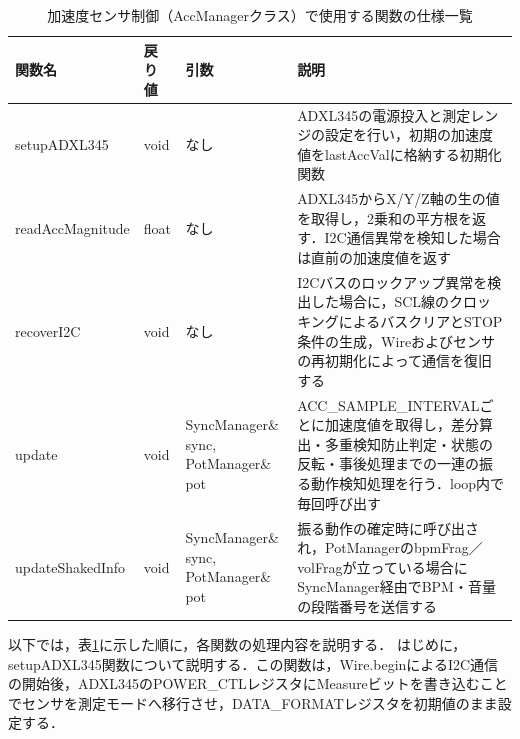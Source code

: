 \begin{table}[H]
    \caption{加速度センサ制御（AccManagerクラス）で使用する関数の仕様一覧}
    \centering
    \label{table:siki_acc_func}
    \begin{tabular}{p{3.8cm}p{1.6cm}p{3.2cm}p{4.9cm}}
    \hline
    \textbf{関数名} & \textbf{戻り値} & \textbf{引数} & \textbf{説明}\\
    \hline
    setupADXL345 & void & なし & ADXL345の電源投入と測定レンジの設定を行い，初期の加速度値をlastAccValに格納する初期化関数\\
    \hline
    readAccMagnitude & float & なし & ADXL345からX/Y/Z軸の生の値を取得し，2乗和の平方根を返す．I2C通信異常を検知した場合は直前の加速度値を返す\\
    \hline
    recoverI2C & void & なし & I2Cバスのロックアップ異常を検出した場合に，SCL線のクロッキングによるバスクリアとSTOP条件の生成，Wireおよびセンサの再初期化によって通信を復旧する\\
    \hline
    update & void & SyncManager\& sync, PotManager\& pot & ACC\_SAMPLE\_INTERVALごとに加速度値を取得し，差分算出・多重検知防止判定・状態の反転・事後処理までの一連の振る動作検知処理を行う．loop内で毎回呼び出す\\
    \hline
    updateShakedInfo & void & SyncManager\& sync, PotManager\& pot & 振る動作の確定時に呼び出され，PotManagerのbpmFrag／volFragが立っている場合にSyncManager経由でBPM・音量の段階番号を送信する\\
    \hline
    \end{tabular}
\end{table}

\fi


\iffalse
以下では，表\ref{table:siki_acc_func}に示した順に，各関数の処理内容を説明する．
はじめに，setupADXL345関数について説明する．この関数は，Wire.beginによるI2C通信の開始後，ADXL345のPOWER\_CTLレジスタにMeasureビットを書き込むことでセンサを測定モードへ移行させ，DATA\_FORMATレジスタを初期値のまま設定する．

% 
% 
% 

